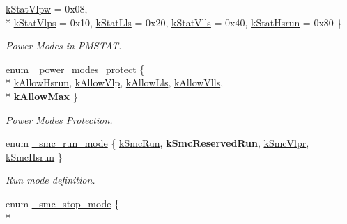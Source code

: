 \begin{DoxyCompactItemize}
\hyperlink{group__smc__hal_gga50d35fdd2a2912b96e155d3f0dd395a4ab17a7d49627a5d21a611d6c339f91aad}{k\+Stat\+Vlpw} = 0x08, 
\\*
\hyperlink{group__smc__hal_gga50d35fdd2a2912b96e155d3f0dd395a4a4c7238e147a42e7cec6b1d5a43ced671}{k\+Stat\+Vlps} = 0x10, 
\hyperlink{group__smc__hal_gga50d35fdd2a2912b96e155d3f0dd395a4a41cfc5cb86a6b0ddbad9e3f2ceb8935f}{k\+Stat\+Lls} = 0x20, 
\hyperlink{group__smc__hal_gga50d35fdd2a2912b96e155d3f0dd395a4ad51299e211890614911587c2f9697362}{k\+Stat\+Vlls} = 0x40, 
\hyperlink{group__smc__hal_gga50d35fdd2a2912b96e155d3f0dd395a4a9b88b31679f2aed3c0af5bdf34c02fd4}{k\+Stat\+Hsrun} = 0x80
 \}\begin{DoxyCompactList}\small\item\em Power Modes in P\+M\+S\+T\+AT. \end{DoxyCompactList}
\item 
enum \hyperlink{group__smc__hal_ga1d6a886af480519a30236be3c73feab2}{\+\_\+power\+\_\+modes\+\_\+protect} \{ \\*
\hyperlink{group__smc__hal_gga1d6a886af480519a30236be3c73feab2a96012d707ef9a93ac8c5c8a230c9b280}{k\+Allow\+Hsrun}, 
\hyperlink{group__smc__hal_gga1d6a886af480519a30236be3c73feab2a0175822301cf1360afb700026f05dfac}{k\+Allow\+Vlp}, 
\hyperlink{group__smc__hal_gga1d6a886af480519a30236be3c73feab2aa36f43291a762ec8d7be9269f98dbffe}{k\+Allow\+Lls}, 
\hyperlink{group__smc__hal_gga1d6a886af480519a30236be3c73feab2a8e7509efe8fbaea8c1e20d4cce22fed9}{k\+Allow\+Vlls}, 
\\*
{\bfseries k\+Allow\+Max}
 \}\begin{DoxyCompactList}\small\item\em Power Modes Protection. \end{DoxyCompactList}
\item 
enum \hyperlink{group__smc__hal_gac2c182287ebbb6119d8bcbb6ead71e53}{\+\_\+smc\+\_\+run\+\_\+mode} \{ \hyperlink{group__smc__hal_ggac2c182287ebbb6119d8bcbb6ead71e53a9ecfd4596ed1197665e2c14347d6497b}{k\+Smc\+Run}, 
{\bfseries k\+Smc\+Reserved\+Run}, 
\hyperlink{group__smc__hal_ggac2c182287ebbb6119d8bcbb6ead71e53a075f1b42aece9f843020a62c62590a77}{k\+Smc\+Vlpr}, 
\hyperlink{group__smc__hal_ggac2c182287ebbb6119d8bcbb6ead71e53adf9002c41c286e5ad29053f9cdb4c792}{k\+Smc\+Hsrun}
 \}\begin{DoxyCompactList}\small\item\em Run mode definition. \end{DoxyCompactList}
\item 
enum \hyperlink{group__smc__hal_ga107d1c64902b4a1a0270a51008b854d5}{\+\_\+smc\+\_\+stop\+\_\+mode} \{ \\*

\end{DoxyCompactItemize}
